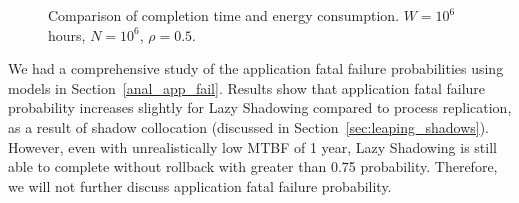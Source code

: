 \begin{figure}[!t]
	\begin{center}
	\end{center}
	\caption{Comparison of completion time and energy consumption. $W=10^6$ hours, $N=10^6$, $\rho=0.5$.}
	\label{fig:3}
\end{figure}

We had a comprehensive study of the application fatal failure probabilities using models in Section~\ref{anal_app_fail}. Results show that application fatal failure probability increases slightly for Lazy Shadowing compared to process replication, as a result of shadow collocation (discussed in Section~\ref{sec:leaping_shadows}). However, even with unrealistically low MTBF of 1 year, Lazy Shadowing is still able to complete without rollback with greater than 0.75 probability. Therefore, we will not further discuss application fatal failure probability.  


